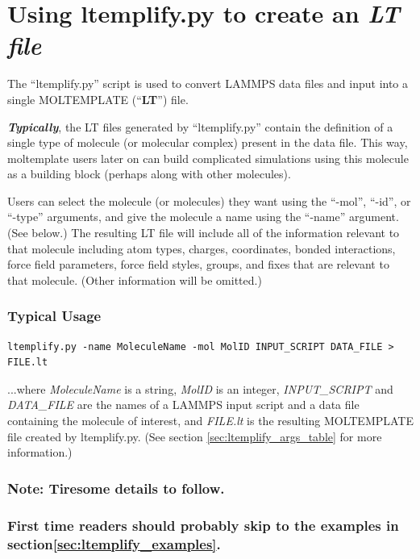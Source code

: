 \documentclass[11pt]{article}
\begin{document}
\section{Using ltemplify.py to create an \textit{LT file}}
\label{sec:ltemplify}

The ``ltemplify.py'' script is used to convert LAMMPS data files and
input into a single MOLTEMPLATE (``\textbf{LT}'') file.

\textbf{\textit{Typically}}, the LT files generated
by ``ltemplify.py'' contain the definition of a single type of molecule
(or molecular complex) present in the data file.
This way, moltemplate users later on can build complicated simulations using
this molecule as a building block (perhaps along with other molecules).

Users can select the molecule (or molecules) they want
using the ``-mol'', ``-id'', or ``-type'' arguments,
and give the molecule a name using the ``-name'' argument.  (See below.)
The resulting LT file will include all of the information relevant
to that molecule including atom types, charges, coordinates,
bonded interactions, force field parameters, force field styles,
groups, and fixes that are relevant to that molecule.
(Other information will be omitted.)

\subsubsection*{Typical Usage}
\begin{verbatim}
ltemplify.py -name MoleculeName -mol MolID INPUT_SCRIPT DATA_FILE > FILE.lt
\end{verbatim}
...where \textit{MoleculeName} is a string,
\textit{MolID} is an integer,
\textit{INPUT\_SCRIPT} and \textit{DATA\_FILE}
are the names of a LAMMPS input script and a data file
containing the molecule of interest,
and \textit{FILE.lt} is the resulting
MOLTEMPLATE file created by ltemplify.py.
(See section \ref{sec:ltemplify_args_table} for more information.)

\subsubsection*{Note: Tiresome details to follow.}
\subsubsection*{First time readers should probably skip to
the examples in section\ref{sec:ltemplify_examples}.}
\end{document}
